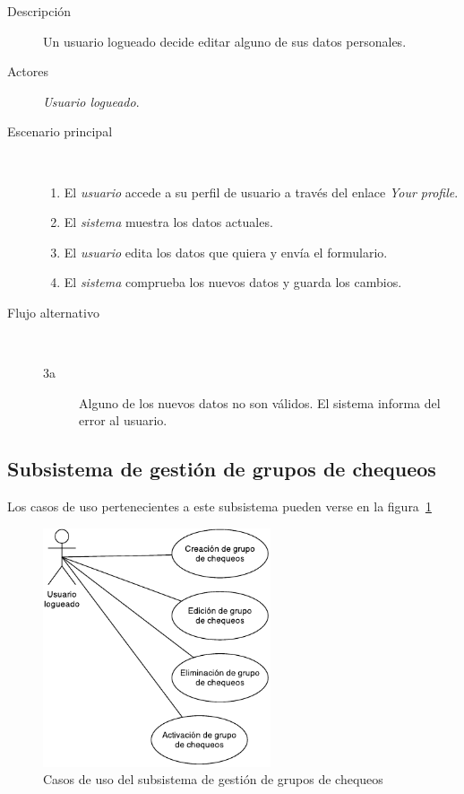 \begin{description}
\item[Descripción] Un usuario logueado decide editar alguno de sus datos personales.
\item[Actores] \textit{Usuario logueado}.
\item[Escenario principal] $\quad$
  \begin{enumerate}
  \item El \textit{usuario} accede a su perfil de usuario a través del enlace \textit{Your profile}.
  \item El \textit{sistema} muestra los datos actuales.
  \item El \textit{usuario} edita los datos que quiera y envía el formulario.
  \item El \textit{sistema} comprueba los nuevos datos y guarda los cambios.
  \end{enumerate}
\item[Flujo alternativo] $\quad$
  \begin{description}
  \item[3a] Alguno de los nuevos datos no son válidos. El sistema informa del error al usuario.
  \end{description}
\end{description}

\subsection{Subsistema de gestión de grupos de chequeos}

Los casos de uso pertenecientes a este subsistema pueden verse en la figura~\ref{fig:subsistema-grupos}

\begin{figure}[hp]
  \centering
  \includegraphics[width=0.6\textwidth]{4_analisis/diagrama_subsistema_gestion_grupos}
  \caption{Casos de uso del subsistema de gestión de grupos de chequeos}
  \label{fig:subsistema-grupos}
\end{figure}

